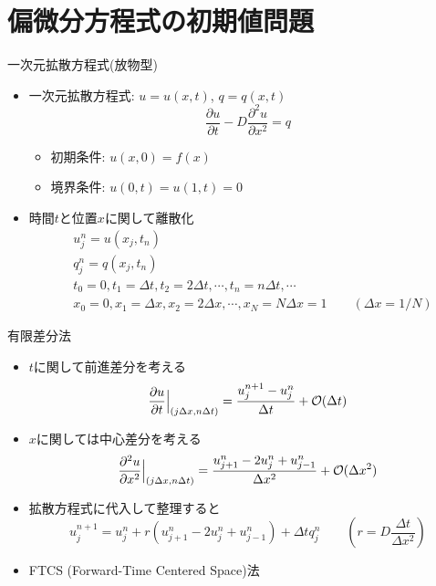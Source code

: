 
\section{偏微分方程式の初期値問題}

\begin{frame}[t]{一次元拡散方程式(放物型)}
  \begin{itemize}
  \item 一次元拡散方程式: $u=u(x,t)$, $q=q(x,t)$
    \[
    \frac{\partial u}{\partial t} - D \frac{\partial^2 u}{\partial x^2} = q
    \]
    \begin{itemize}
    \item 初期条件: $u(x,0) = f(x)$
    \item 境界条件: $u(0,t) = u(1,t) = 0$
    \end{itemize}
  \item 時間$t$と位置$x$に関して離散化
    \begin{align*}
      & u_j^n = u(x_j, t_n) \\
      & q_j^n = q(x_j, t_n) \\
      & t_0 = 0, t_1=\Delta t, t_2=2 \Delta t, \cdots, t_n=n \Delta t, \cdots \\
      & x_0 = 0, x_1=\Delta x, x_2=2 \Delta x, \cdots, x_N=N \Delta x = 1 \qquad (\Delta x = 1/N)
    \end{align*}
  \end{itemize}
\end{frame}

\begin{frame}[t]{有限差分法}
  \begin{itemize}
  \item $t$に関して前進差分を考える
    \[
    \frac{\partial u}{\partial t} \Big|_{(j \Delta x, n \Delta t)} = \frac{u_j^{n+1} - u_j^n}{\Delta t} + {\cal O}(\Delta t)
    \]
  \item $x$に関しては中心差分を考える
    \[
    \frac{\partial^2 u}{\partial x^2} \Big|_{(j \Delta x, n \Delta t)} = \frac{u_{j+1}^{n} - 2 u_{j}^{n} + u_{j-1}^{n}}{\Delta x^2} + {\cal O}(\Delta x^2)
    \]
  \item 拡散方程式に代入して整理すると
    \[
    u_{j}^{n+1} = u_{j}^{n} + r (u_{j+1}^{n} - 2 u_{j}^{n} + u_{j-1}^{n}) + \Delta t q_{j}^{n} \qquad (r = D\frac{\Delta t}{\Delta x^2})
    \]
  \item FTCS (Forward-Time Centered Space)法
  \end{itemize}
\end{frame}

